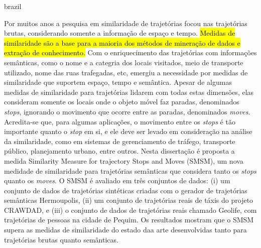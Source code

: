 \swapcontents
{
    \begin{otherlanguage*}{brazil}
    \begin{resumo}[Resumo]

        Por muitos anos a pesquisa em similaridade de trajetórias focou nas trajetórias brutas, considerando somente a informação de espaço e tempo. \hl{Medidas de similaridade são a base para a maioria dos métodos de mineração de dados e extração de conhecimento. }Com o enriquecimento das trajetórias com informações semânticas, como o nome e a categria dos locais visitados, meio de transporte utilizado, nome das ruas trafegadas, etc, emergiu a necessidade por medidas de similaridade que suportem espaço, tempo e semântica. Apesar de algumas medidas de similaridade para trajetórias lidarem com todas estas dimensões, elas consideram somente os locais onde o objeto móvel faz paradas, denominados \emph{stops}, ignorando o movimento que ocorre entre as paradas, denominados \emph{moves}.
        Acredita-se que, para algumas aplicações, o movimento entre os \emph{stops} é tão importante quanto o \emph{stop} em si, e ele deve ser levado em consideração na análise da similaridade, como em sistemas de gerenciamento de tráfego, transporte público, planejamento urbano, entre outros.
        Nesta dissertação é proposta a medida Similarity Measure for trajectory Stops and Moves (SMSM), um nova medidade de similaridade para trajetórias semânticas que considera tanto os \emph{stops} quanto os \emph{moves}.
        O SMSM é avaliado em três conjuntos de dados: (i) um conjunto de dados de trajetórias sintéticas criadas com o gerador de trajetórias semânticas Hermoupolis, (ii) um conjunto de trajetórias reais de táxis do projeto CRAWDAD, e (iii) o conjunto de dados de trajetórias reais chamado Geolife, com trajetórias de pessoas na cidade de Pequim. Os resultados mostram que o SMSM supera as medidas de similaridade do estado daa arte desenvolvidas tanto para trajetórias brutas quanto semânticas.
        

    \end{resumo}
    \end{otherlanguage*}
}
